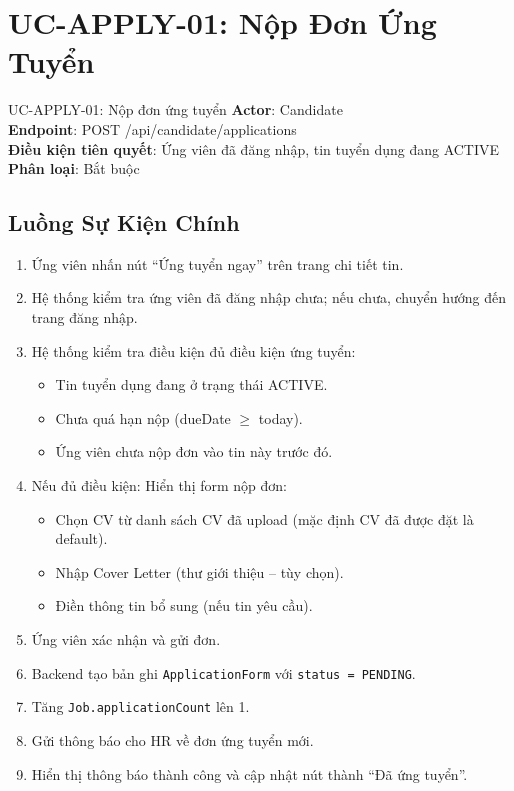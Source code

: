 \documentclass[12pt, a4paper]{report}
\begin{document}
\section{UC-APPLY-01: Nộp Đơn Ứng Tuyển}

\begin{requirementbox}{UC-APPLY-01: Nộp đơn ứng tuyển}
\textbf{Actor}: Candidate \\
\textbf{Endpoint}: POST /api/candidate/applications \\
\textbf{Điều kiện tiên quyết}: Ứng viên đã đăng nhập, tin tuyển dụng đang ACTIVE \\
\textbf{Phân loại}: Bắt buộc
\end{requirementbox}

\subsection{Luồng Sự Kiện Chính}

\begin{enumerate}
    \item Ứng viên nhấn nút ``Ứng tuyển ngay'' trên trang chi tiết tin.
    \item Hệ thống kiểm tra ứng viên đã đăng nhập chưa; nếu chưa, chuyển hướng đến trang đăng nhập.
    \item Hệ thống kiểm tra điều kiện đủ điều kiện ứng tuyển:
    \begin{itemize}
        \item Tin tuyển dụng đang ở trạng thái ACTIVE.
        \item Chưa quá hạn nộp (dueDate $\geq$ today).
        \item Ứng viên chưa nộp đơn vào tin này trước đó.
    \end{itemize}
    \item Nếu đủ điều kiện: Hiển thị form nộp đơn:
    \begin{itemize}
        \item Chọn CV từ danh sách CV đã upload (mặc định CV đã được đặt là default).
        \item Nhập Cover Letter (thư giới thiệu -- tùy chọn).
        \item Điền thông tin bổ sung (nếu tin yêu cầu).
    \end{itemize}
    \item Ứng viên xác nhận và gửi đơn.
    \item Backend tạo bản ghi \texttt{ApplicationForm} với \texttt{status = PENDING}.
    \item Tăng \texttt{Job.applicationCount} lên 1.
    \item Gửi thông báo cho HR về đơn ứng tuyển mới.
    \item Hiển thị thông báo thành công và cập nhật nút thành ``Đã ứng tuyển''.
\end{enumerate}
\end{document}

